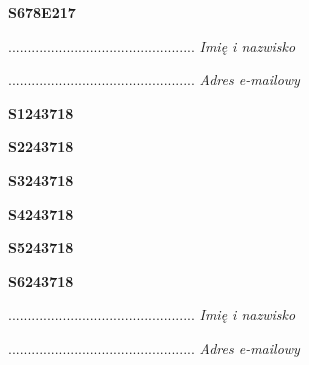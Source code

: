 \begin{turn}{90}\huge \textbf{S678E217}\end{turn}

\begin{turn}{90}\begin{minipage}{\linewidth} \vspace{20mm} ................................................  \textit{Imię i nazwisko}\end{minipage}\end{turn}

\begin{turn}{90}\begin{minipage}{\linewidth} \vspace{20mm} ................................................  \textit{Adres e-mailowy}\end{minipage}\end{turn}

\begin{turn}{90}\huge \textbf{S1243718}\end{turn}

\begin{turn}{90}\huge \textbf{S2243718}\end{turn}

\begin{turn}{90}\huge \textbf{S3243718}\end{turn}

\begin{turn}{90}\huge \textbf{S4243718}\end{turn}

\begin{turn}{90}\huge \textbf{S5243718}\end{turn}

\begin{turn}{90}\huge \textbf{S6243718}\end{turn}

\begin{turn}{90}\begin{minipage}{\linewidth} \vspace{20mm} ................................................  \textit{Imię i nazwisko}\end{minipage}\end{turn}

\begin{turn}{90}\begin{minipage}{\linewidth} \vspace{20mm} ................................................  \textit{Adres e-mailowy}\end{minipage}\end{turn}

